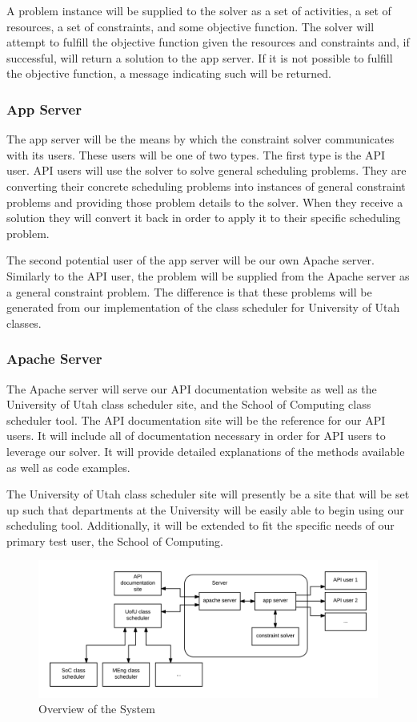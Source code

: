 \documentclass{extarticle}
\begin{document}
A problem instance will be supplied to the solver as a set of activities, a set of resources, a set of constraints,
and some objective function.  The solver will attempt to fulfill the objective function given the resources and
constraints and, if successful, will return a solution to the app server.  If it is not possible to fulfill the
objective function, a message indicating such will be returned.

\subsubsection{App Server}
The app server will be the means by which the constraint solver communicates with its users.  These users will be
one of two types.  The first type is the API user.  API users will use the solver to solve general scheduling
problems.  They are converting their concrete scheduling problems into instances of general constraint problems and
providing those problem details to the solver.  When they receive a solution they will convert it back in order to
apply it to their specific scheduling problem.

The second potential user of the app server will be our own Apache server.  Similarly to the API user, the problem
will be supplied from the Apache server as a general constraint problem.  The difference is that these problems will
be generated from our implementation of the class scheduler for University of Utah classes.

\subsubsection{Apache Server}
The Apache server will serve our API documentation website as well as the University of Utah class scheduler site,
and the School of Computing class scheduler tool.  The API documentation site will be the reference for our API
users.  It will include all of documentation necessary in order for API users to leverage our solver.  It will
provide detailed explanations of the methods available as well as code examples.

The University of Utah class scheduler site will presently be a site that will be set up such that departments at
the University will be easily able to begin using our scheduling tool.  Additionally, it will be extended to fit the
specific needs of our primary test user, the School of Computing.

\begin{figure}[!ht]
\centering
\includegraphics[width=1.0\textwidth]{img/general_sys_arch}
\caption{Overview of the System}
\label{fig:sys_arch}
\end{figure}
\end{document}
